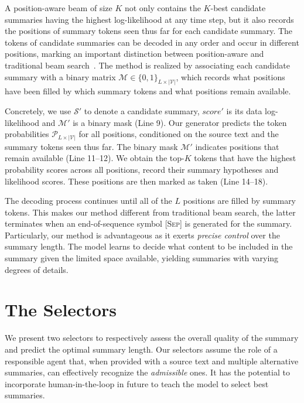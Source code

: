 \documentclass[11pt]{article}
\begin{document}
A position-aware beam of size $K$ not only contains the $K$-best candidate summaries having the highest log-likelihood at any time step, but it also records the positions of summary tokens seen thus far for each candidate summary.
The tokens of candidate summaries can be decoded in any order and occur in different positions, marking an important distinction between position-aware and traditional beam search~\cite{meister-etal-2020-beam}.
The method is realized by associating each candidate summary with a binary matrix $\mathcal{M} \in \{0,1\}_{L \times |\mathcal{V}|}$, which records what positions have been filled by which summary tokens and what positions remain available.


Concretely, we use $\mathcal{S}'$ to denote a candidate summary, $score'$ is its data log-likelihood and $\mathcal{M}'$ is a binary mask (Line 9).
Our generator predicts the token probabilities $\mathcal{P}_{L\times|\mathcal{V}|}$ for all positions, conditioned on the source text and the summary tokens seen thus far.
The binary mask $\mathcal{M}'$ indicates positions that remain available (Line 11--12).
We obtain the top-$K$ tokens that have the highest probability scores across all positions, record their summary hypotheses and likelihood scores.
These positions are then marked as taken (Line 14--18).


The decoding process continues until all of the $L$ positions are filled by summary tokens.
This makes our method different from traditional beam search, the latter terminates when an end-of-sequence symbol \textsc{[Sep]} is generated for the summary.
Particularly, our method is advantageous as it exerts \emph{precise control} over the summary length. 
The model learns to decide what content to be included in the summary given the limited space available, yielding summaries with varying degrees of details.


\section{The Selectors}
\label{sec:selector}


We present two selectors to respectively assess the overall quality of the summary and predict the optimal summary length.
Our selectors assume the role of a responsible agent that, when provided with a source text and multiple alternative summaries, can effectively recognize the \emph{admissible} ones.
It has the potential to incorporate human-in-the-loop in future to teach the model to select best summaries.
\end{document}
